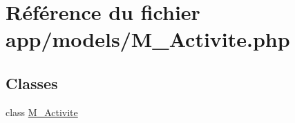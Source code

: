 \hypertarget{_m___activite_8php}{}\section{Référence du fichier app/models/\+M\+\_\+\+Activite.php}
\label{_m___activite_8php}
\subsection*{Classes}
\begin{DoxyCompactItemize}
\item 
class \hyperlink{class_m___activite}{M\+\_\+\+Activite}
\end{DoxyCompactItemize}

